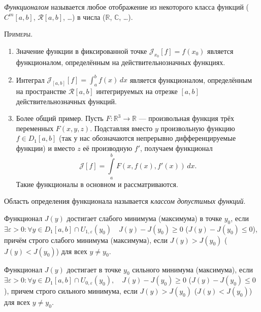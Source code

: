  \label{teor-15}

\begin{definition}
	\emph{Функционалом}
	называется любое отображение из некоторого класса функций ($ C^m[a, b] $, $
	\mathscr R[a,b] $, \ldots) в числа
	($ \mathbb R $, $ \mathbb C $, \ldots). 
\end{definition}

\textsc{Примеры.}
\begin{enumerate}
	\item Значение функции в фиксированной точке $ \mathscr{J}_{x_0}[f] = f(x_0) $
	является функционалом, определённым на действительнозначных функциях.
	\item\label{enum1:2} Интеграл $ \mathscr{J}_{[a,b]}[f] = \int_{a}^{b} f(x)\,dx $ является
	функционалом, определённым на пространстве $ \mathscr{R}[a,b] $
	интегрируемых на отрезке $ [a,b] $ действительнозначных функций.
	\item Более общий пример. Пусть $ F\colon \mathbb R^3 \to \mathbb R $ ---
	произвольная функция трёх переменных $ F(x, y, z) $. Подставляя вместо $ y $
	произвольную функцию $ f \in D_1[a, b] $ (так у нас обозначаются непрерывно
	дифференцируемые функции) и вместо $ z $ её производную $ f'
	$, получаем функционал  
	\[
	\mathscr{J}[f] = \int\limits_{a}^{b}F(x, f(x), f'(x))\,dx.
	\]
	Такие функционалы в основном и рассматриваются. 
\end{enumerate}

\begin{definition}
	Область определения функционала называется \textit{классом допустимых функций}.
\end{definition}

\begin{definition}
	Функционал $J(y)$ достигает слабого минимума (максимума) в точке $y_0$, если $\exists \varepsilon > 0 : \forall y \in D_1[a, b] \cap U_{1, \varepsilon}(y_0) \quad J(y) - J(y_0) \geqslant 0$ ($J(y) - J(y_0) \leqslant 0$), причём строго слабого минимума (максимума), если $J(y) > J(y_0)$ ($J(y) < J(y_0)$) для всех $y \not = y_0$.
\end{definition}

\begin{definition}
	Функционал $J(y)$ достигает в точке $y_0$ сильного минимума (максимума), если $\exists \varepsilon > 0 : \forall y \in D_1[a, b] \cap U_{0, \varepsilon}(y_0), \quad J(y) - J(y_0) \geqslant 0$ ($J(y) - J(y_0) \leqslant 0$), причем строго сильного минимума, если $J(y) > J(y_0)$ ($J(y) < J(y_0)$) для всех $y \not = y_0$. 
\end{definition}


